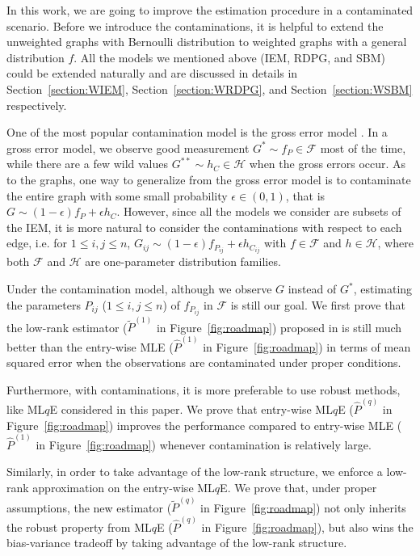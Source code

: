 \documentclass[a4paper]{article}
\renewcommand{\hat}{\widehat}
\begin{document}
In this work, we are going to improve the estimation procedure in a contaminated scenario. Before we introduce the contaminations, it is helpful to extend the unweighted graphs with Bernoulli distribution to weighted graphs with a general distribution $f$. All the models we mentioned above (IEM, RDPG, and SBM) could be extended naturally and are discussed in details in Section~\ref{section:WIEM}, Section~\ref{section:WRDPG}, and Section~\ref{section:WSBM} respectively.

One of the most popular contamination model is the gross error model \citep{AIC:AIC690280519, bickel2001mathematical}. In a gross error model, we observe good measurement $G^* \sim f_P \in \mathcal{F}$ most of the time, while there are a few wild values $G^{**} \sim h_C \in \mathcal{H}$ when the gross errors occur.
As to the graphs, one way to generalize from the gross error model is to contaminate the entire graph with some small probability $\epsilon \in (0, 1)$, that is $G \sim (1-\epsilon) f_P + \epsilon h_C$. However, since all the models we consider are subsets of the IEM, it is more natural to consider the contaminations with respect to each edge, i.e. for $1 \le i, j \le n$, $G_{ij} \sim (1-\epsilon) f_{P_{ij}} + \epsilon h_{C_{ij}}$ with $f \in \mathcal{F}$ and $h \in \mathcal{H}$, where both $\mathcal{F}$ and $\mathcal{H}$ are one-parameter distribution families.

Under the contamination model, although we observe $G$ instead of $G^*$, estimating the parameters $P_{ij}$ ($1 \le i, j \le n$) of $f_{P_{ij}}$ in $\mathcal{F}$ is still our goal. We first prove that the low-rank estimator ($\widetilde{P}^{(1)}$ in Figure~\ref{fig:roadmap}) proposed in \citep{tang2016law} is still much better than the entry-wise MLE ($\hat{P}^{(1)}$ in Figure~\ref{fig:roadmap}) in terms of mean squared error when the observations are contaminated under proper conditions.

Furthermore, with contaminations, it is more preferable to use robust methods, like ML$q$E \citep{ferrari2010, qin2013maximum} considered in this paper. We prove that entry-wise ML$q$E ($\hat{P}^{(q)}$ in Figure~\ref{fig:roadmap}) improves the performance compared to entry-wise MLE ($\hat{P}^{(1)}$ in Figure~\ref{fig:roadmap}) whenever contamination is relatively large.

Similarly, in order to take advantage of the low-rank structure, we enforce a low-rank approximation on the entry-wise ML$q$E. We prove that, under proper assumptions, the new estimator ($\widetilde{P}^{(q)}$ in Figure~\ref{fig:roadmap}) not only inherits the robust property from ML$q$E ($\hat{P}^{(q)}$ in Figure~\ref{fig:roadmap}), but also wins the bias-variance tradeoff by taking advantage of the low-rank structure.
\end{document}
